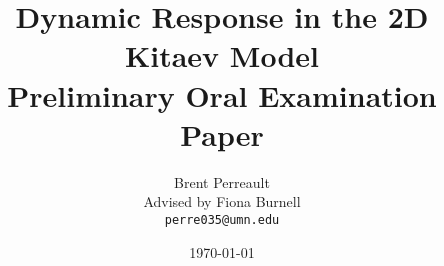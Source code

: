 \documentclass[aps,pra,preprint,groupedaddress]{revtex4-1}
\newcommand{\1}{\mathds{1}}
\begin{document}
\title{Dynamic Response in the 2D Kitaev Model \\ {\small Preliminary Oral Examination Paper}}


\author{Brent Perreault \\ {\small Advised by Fiona Burnell  \\
\texttt{perre035@umn.edu}}}
%


\date{\today} 
\end{document}
